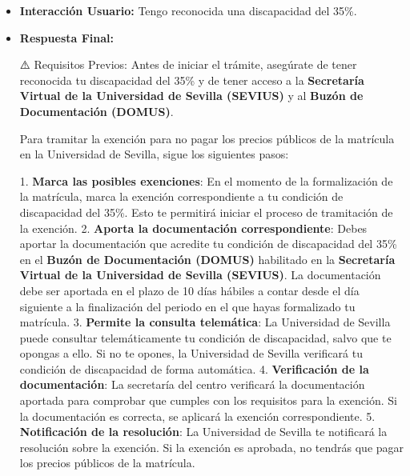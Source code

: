 \documentclass{article}
\begin{document}
\begin{itemize}
\begin{itemize}
                Es recomendable que el estudiante consulte con la secretaría del centro o con la Universidad de Sevilla para obtener más información sobre el procedimiento y los requisitos necesarios para tramitar la exención.
          \item \textbf{Interacción Usuario:} Tengo reconocida una discapacidad del 35\%.
          \item \textbf{Respuesta Final:}

                ⚠️ Requisitos Previos:
                Antes de iniciar el trámite, asegúrate de tener reconocida tu discapacidad del 35\% y de tener acceso a la \textbf{Secretaría Virtual de la Universidad de Sevilla (SEVIUS)} y al \textbf{Buzón de Documentación (DOMUS)}.

                Para tramitar la exención para no pagar los precios públicos de la matrícula en la Universidad de Sevilla, sigue los siguientes pasos:

                1. \textbf{Marca las posibles exenciones}: En el momento de la formalización de la matrícula, marca la exención correspondiente a tu condición de discapacidad del 35\%. Esto te permitirá iniciar el proceso de tramitación de la exención.
                2. \textbf{Aporta la documentación correspondiente}: Debes aportar la documentación que acredite tu condición de discapacidad del 35\% en el \textbf{Buzón de Documentación (DOMUS)} habilitado en la \textbf{Secretaría Virtual de la Universidad de Sevilla (SEVIUS)}. La documentación debe ser aportada en el plazo de 10 días hábiles a contar desde el día siguiente a la finalización del periodo en el que hayas formalizado tu matrícula.
                3. \textbf{Permite la consulta telemática}: La Universidad de Sevilla puede consultar telemáticamente tu condición de discapacidad, salvo que te opongas a ello. Si no te opones, la Universidad de Sevilla verificará tu condición de discapacidad de forma automática.
                4. \textbf{Verificación de la documentación}: La secretaría del centro verificará la documentación aportada para comprobar que cumples con los requisitos para la exención. Si la documentación es correcta, se aplicará la exención correspondiente.
                5. \textbf{Notificación de la resolución}: La Universidad de Sevilla te notificará la resolución sobre la exención. Si la exención es aprobada, no tendrás que pagar los precios públicos de la matrícula.


\end{itemize}
\end{itemize}
\end{document}
